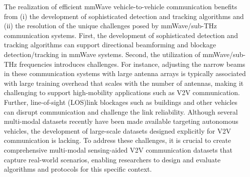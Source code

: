\documentclass[10pt,comsoc]{IEEEtran}
\begin{document}
The realization of efficient mmWave vehicle-to-vehicle communication benefits from (i) the development of sophisticated detection and tracking algorithms and (ii) the resolution of the unique challenges posed by mmWave/sub-THz communication systems. First, the development of sophisticated detection and tracking algorithms can support directional beamforming and blockage detection/tracking in mmWave systems.  Second, the utilization of mmWave/sub-THz frequencies introduces challenges. For instance, adjusting the narrow beams in these communication systems with large antenna arrays is typically associated with large training overhead that scales with the number of antennas, making it challenging to support high-mobility applications such as V2V communication. Further, line-of-sight (LOS)link blockages such as buildings and other vehicles can disrupt communication and challenge the link reliability. Although several multi-modal datasets \cite{ caesar2020nuscenes, llc2019waymo, pham20203d} recently have been made available targeting autonomous vehicles, the development of large-scale datasets designed explicitly for V2V communication is lacking. To address these challenges, it is crucial to create comprehensive multi-modal sensing-aided V2V communication datasets that capture real-world scenarios, enabling researchers to design and evaluate algorithms and protocols for this specific context. 
\end{document}
